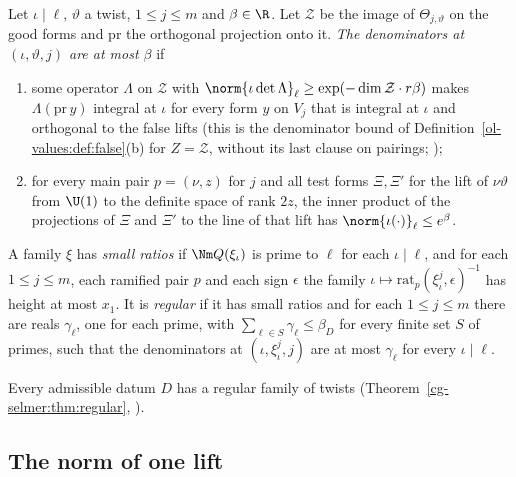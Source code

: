 \begin{definition}\label{det-chain:def:regular}
Let $\iota\mid\ell$, $\vartheta$ a twist, $1\le j\le m$ and $\beta\in\R$. Let $\mathcal{Z}$ be the
image of $\Theta_{j,\vartheta}$ on the good forms and $\mathrm{pr}$ the orthogonal projection onto
it. \emph{The denominators at $(\iota,\vartheta,j)$ are at most $\beta$} if
\begin{enumerate}[label=(\roman*)]
\item some operator $\Lambda$ on $\mathcal{Z}$ with $\norm{\iota\det\Lambda}_\ell\ge
  \exp(-\dim\mathcal{Z}\cdot r\beta)$ makes $\Lambda(\mathrm{pr}\,y)$ integral at $\iota$ for every
  form $y$ on $V_j$ that is integral at $\iota$ and orthogonal to the false lifts (this is the
  denominator bound of Definition~\ref{ol-values:def:false}(b) for $Z=\mathcal Z$, without its last
  clause on pairings; );
\item for every main pair $p=(\nu,z)$ for $j$ and all test forms $\Xi,\Xi'$ for the lift of
  $\nu\vartheta$ from $\U(1)$ to the definite space of rank $2z$, the inner product of the
  projections of $\Xi$ and $\Xi'$ to the line of that lift has $\norm{\iota(\cdot)}_\ell\le e^\beta$.
\end{enumerate}
A family $\xi$ has \emph{small ratios} if $\Nm Q(\xi_\iota)$ is prime to $\ell$ for each
$\iota\mid\ell$, and for each $1\le j\le m$, each ramified pair $p$ and each sign $\epsilon$ the family
$\iota\mapsto\mathrm{rat}_p(\xi_\iota^j,\epsilon)^{-1}$ has height at most $x_1$. It is
\emph{regular} if it has small ratios and for each $1\le j\le m$ there are reals $\gamma_\ell$,
one for each prime, with $\sum_{\ell\in S}\gamma_\ell\le\beta_D$ for every finite set $S$ of primes,
such that the denominators at $(\iota,\xi_\iota^j,j)$ are at most $\gamma_\ell$ for every
$\iota\mid\ell$.
\end{definition}

Every admissible datum $D$ has a regular family of twists (Theorem~\ref{cg-selmer:thm:regular},
).

\subsection{The norm of one lift}\label{det-chain:sec:onelift}

